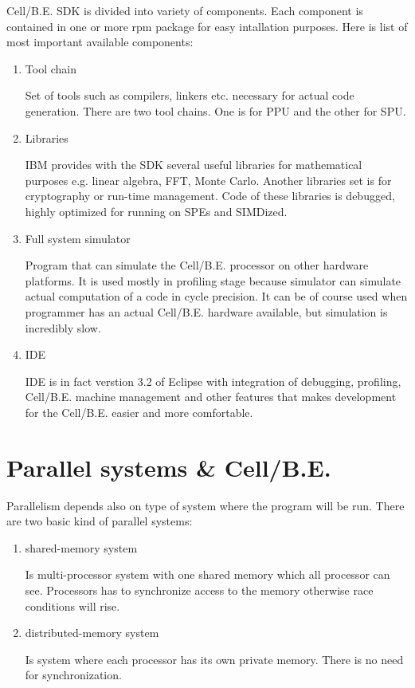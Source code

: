 Cell/B.E. SDK is divided into variety of components.
Each component is contained in one or more rpm package for easy intallation purposes.
Here is list of most important available components:
\begin{enumerate}
  \item {Tool chain}
  \par
  Set of tools such as compilers, linkers etc. necessary for actual code generation.
There are two tool chains.
One is for PPU and the other for SPU.

  \item {Libraries}
  \par
  IBM provides with the SDK several useful libraries for mathematical purposes e.g. linear algebra, FFT, Monte Carlo.
Another libraries set is for cryptography or run-time management.
Code of these libraries is debugged, highly optimized for running on SPEs and SIMDized.

  \item {Full system simulator}
  \par
  Program that can simulate the Cell/B.E. processor on other hardware platforms.
It is used mostly in profiling stage because simulator can simulate actual computation of a code in cycle precision.
It can be of course used when programmer has an actual Cell/B.E. hardware available, but simulation is incredibly slow.

  \item {IDE}
  \par
  IDE is in fact verstion 3.2 of Eclipse with integration of debugging, profiling, Cell/B.E. machine management and other features that makes development for the Cell/B.E. easier and more comfortable.
\end{enumerate}


\section{Parallel systems \& Cell/B.E.}

Parallelism depends also on type of system where the program will be run.
There are two basic kind of parallel systems:
\begin{enumerate}
\item {shared-memory system}
\par
Is multi-processor system with one shared memory which all processor can see.
Processors has to synchronize access to the memory otherwise race conditions will rise.

\item {distributed-memory system}
\par
Is system where each processor has its own private memory.
There is no need for synchronization.
\end{enumerate}


